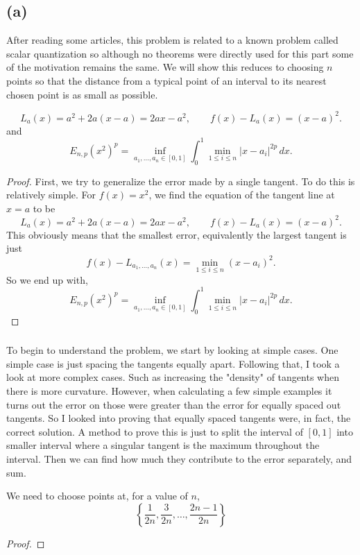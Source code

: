 \documentclass[11pt]{scrartcl}
\begin{document}
\subsection{(a)}

\begin{soln}
	After reading some articles, this problem is related to a known problem 
	called scalar quantization so although no theorems were directly 
	used for this part some of the motivation remains the same. We will 
    show this reduces to choosing $n$ points so that the distance from a typical point of an
    interval to its nearest chosen point is as small as possible.
	\begin{claim*}
	    \[
    L_a(x)=a^2+2a(x-a)=2ax-a^2,
    \qquad
    f(x)-L_a(x)=(x-a)^2.
    \] and 
	    \[
    E_{n,p}(x^2)^p
    =\inf_{a_1,\ldots,a_n\in[0,1]}
    \int_0^1\min_{1\le i\le n}|x-a_i|^{2p}\,dx.
    \]
	\end{claim*}
	\begin{proof}
	First, we try to generalize the error made by a single tangent. To do this is relatively
	simple. For $f(x)=x^2$, we find the equation of the tangent line at $x=a$ to be
    \[
    L_a(x)=a^2+2a(x-a)=2ax-a^2,
    \qquad
    f(x)-L_a(x)=(x-a)^2.
    \]
    This obviously means that the smallest error, equivalently the largest
	tangent is just
    \[
    f(x)-L_{a_1,\ldots,a_n}(x)
    =\min_{1\le i\le n}(x-a_i)^2.
    \]
    So we end up with,
    \[
    E_{n,p}(x^2)^p
    =\inf_{a_1,\ldots,a_n\in[0,1]}
    \int_0^1\min_{1\le i\le n}|x-a_i|^{2p}\,dx.
    \]
	\end{proof}

    \subsubsection*{}

    To begin to understand the problem, we start by looking at simple cases. One simple 
    case is just spacing the tangents equally apart. 
    Following that, I took a look at more complex cases. Such as increasing the "density" of tangents
    when there is more curvature. However, when calculating a few simple examples it turns out the error on those 
    were greater than the error for equally spaced out tangents.
    So I looked into proving that equally spaced tangents were, in fact, the correct solution.
    A method to prove this is just to split the interval of $[0,1]$
	into smaller interval where a singular tangent
    is the maximum throughout the interval.
    Then we can find how much they contribute to the error separately, and sum.
	\begin{claim*}
		We need to choose points at, for a value of $n$,     \[
        \left\{\frac{1}{2n},\frac{3}{2n},\ldots,
        \frac{2n-1}{2n}\right\} \]
	\end{claim*}
	\begin{proof}
		

\end{proof}
\end{soln}
\end{document}
